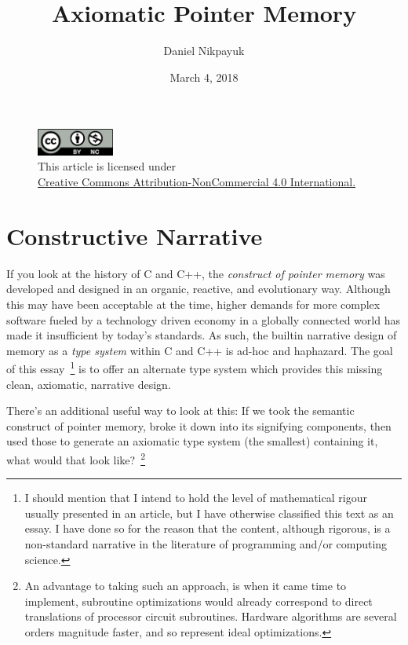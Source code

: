\documentclass[twoside]{article}
\title{Axiomatic Pointer Memory}
\author{Daniel Nikpayuk}
\date{March 4, 2018}
\begin{document}
\maketitle
\thispagestyle{empty}

\begin{figure}[h]
\centering
\includegraphics[width=1in]{../../../cc-by-nc.png}\\[0.1in]
\tiny This article is licensed under \\
\href{http://creativecommons.org/licenses/by-nc/4.0/}
{Creative Commons Attribution-NonCommercial 4.0 International.}\\[0.3in]
\end{figure}

\section*{Constructive Narrative}

If you look at the history of C and C++, the \emph{construct of pointer memory} was developed and designed in an organic, reactive,
and evolutionary way. Although this may have been acceptable at the time, higher demands for more complex software fueled by
a technology driven economy in a globally connected world has made it insufficient by today's standards. As such, the builtin
narrative design of memory as a \emph{type system} within C and C++ is ad-hoc and haphazard. The goal of this essay~\footnote{I
should mention that I intend to hold the level of mathematical rigour usually presented in an article, but I have otherwise
classified this text as an essay. I have done so for the reason that the content, although rigorous, is a non-standard narrative
in the literature of programming and/or computing science.} is to offer an alternate type system which provides this missing clean,
axiomatic, narrative design.

There's an additional useful way to look at this: If we took the semantic construct of pointer memory, broke it down into its
signifying components, then used those to generate an axiomatic type system (the smallest) containing it, what would that look
like?~\footnote{An advantage to taking such an approach, is when it came time to implement, subroutine optimizations would
already correspond to direct translations of processor circuit subroutines. Hardware algorithms are several orders magnitude
faster, and so represent ideal optimizations.}
\end{document}
